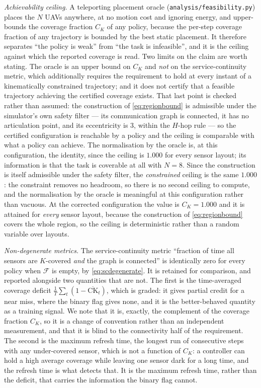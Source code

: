 \documentclass[conference]{IEEEtran}
\begin{document}
\emph{Achievability ceiling.} A teleporting placement oracle
(\texttt{analysis/feasibility.py}) places the $N$ UAVs anywhere, at no
motion cost and ignoring energy, and upper-bounds the coverage fraction
$C_K$ of any policy, because the per-step coverage fraction of any
trajectory is bounded by the best static placement.  It therefore separates
``the policy is weak'' from ``the task is infeasible'', and it is the
ceiling against which the reported coverage is read.  Two limits on the
claim are worth stating.  The oracle is an upper bound on $C_K$ and \emph{not}
on the service-continuity metric, which additionally requires the
requirement to hold at every instant of a kinematically constrained
trajectory; and it does not certify that a feasible trajectory achieving the
certified coverage exists.  That last point is checked rather than
assumed: the construction of \eqref{eq:regionbound} is admissible under
the simulator's own safety filter --- its communication graph is connected,
it has no articulation point, and its eccentricity is $3$, within the
$H$-hop rule --- so the certified configuration is reachable by a policy
and the ceiling is comparable with what a policy can achieve.  The
normalisation by the oracle is, at this configuration, the identity, since
the ceiling is $1.000$ for every sensor layout; its information is that the
task is coverable at all with $N=8$. Since the construction is itself
admissible under the safety filter, the \emph{constrained} ceiling is
the same $1.000$: the constraint removes no headroom, so there is no
second ceiling to compute, and the normalisation by the oracle is
meaningful at this configuration rather than vacuous.  At the corrected configuration the value is
$C_K=1.000$ and it is attained for \emph{every} sensor layout, because the
construction of \eqref{eq:regionbound} covers the whole region, so the
ceiling is deterministic rather than a random variable over layouts.

\emph{Non-degenerate metrics.} The service-continuity metric
``fraction of time all sensors are $K$-covered \emph{and} the graph is
connected'' is identically zero for every policy when $\mathcal{F}$ is
empty, by \eqref{eq:scdegenerate}.  It is retained for comparison, and
reported alongside two quantities that are not.  The first is the
time-averaged coverage deficit $\frac1T\sum_t(1-\overline{\mathrm{CK}}_t)$,
which is graded: it gives partial credit for a near miss, where the binary
flag gives none, and it is the better-behaved quantity as a training
signal.  We note that it is, exactly, the complement of the coverage
fraction $C_K$, so it is a change of convention rather than an independent
measurement, and that it is blind to the connectivity half of the
requirement.  The second is the maximum refresh time, the longest run of
consecutive steps with any under-covered sensor, which is not a function of
$C_K$: a controller can hold a high average coverage while leaving one
sensor dark for a long time, and the refresh time is what detects that.  It
is the maximum refresh time, rather than the deficit, that carries the
information the binary flag cannot.
\end{document}

